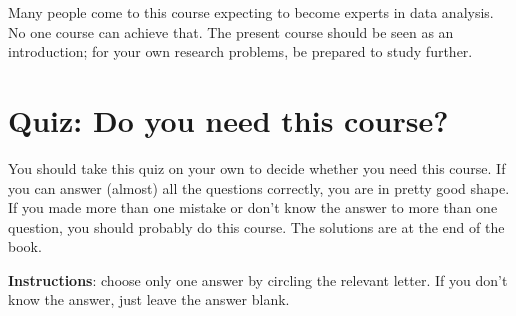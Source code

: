 \documentclass[12pt]{book}\usepackage[]{graphicx}\usepackage[]{color}
\begin{document}
Many people come to this course expecting to become experts in data analysis. No one course can achieve that. The present course should be seen as an introduction; for your own research problems, be prepared to study further.

\section{Quiz: Do you need this course?}

You should take this quiz on your own to decide whether you need this course. If you can answer (almost) all the questions correctly, you are in pretty good shape. If you made more than one mistake or don't know the answer to more than one question, you should probably do this course. The solutions are at the end of the book.

\textbf{Instructions}: choose only one answer by circling the relevant letter. If you don't know the answer, just leave the answer blank. 
\end{document}
